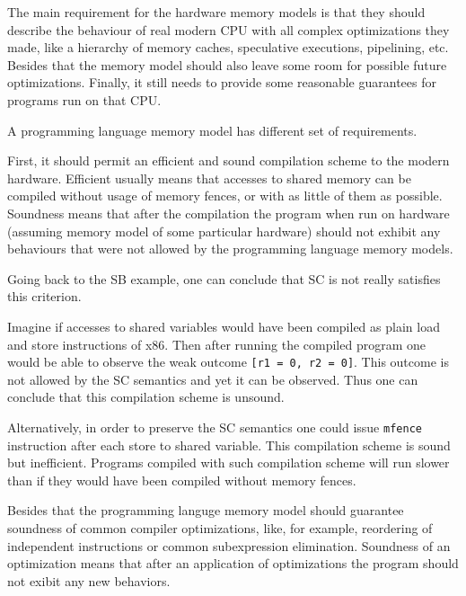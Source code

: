 \documentclass[a4paper,twoside,11pt]{article}
\numberwithin{equation}{section}
\begin{document}
The main requirement for the hardware memory models is that 
they should describe the behaviour of real modern CPU 
with all complex optimizations they made, like a hierarchy of memory caches, speculative executions, pipelining, etc.
Besides that the memory model should also leave some room for possible future optimizations.
Finally, it still needs to provide some reasonable guarantees for programs run on that CPU.       


A programming language memory model has different set of requirements.

First, it should permit an efficient and sound compilation scheme to the modern hardware.
Efficient usually means that accesses to shared memory can be compiled 
without usage of memory fences, or with as little of them as possible. 
Soundness means that after the compilation the program when run on hardware 
(assuming memory model of some particular hardware) should not exhibit
any behaviours that were not allowed by the programming language memory models. 

Going back to the SB example, one can conclude that SC is not really satisfies this criterion. 

Imagine if accesses to shared variables would have been compiled as plain load and store instructions of x86.
Then after running the compiled program one would be able to observe the weak outcome \texttt{[r1 = 0, r2 = 0]}.
This outcome is not allowed by the SC semantics and yet it can be observed.
Thus one can conclude that this compilation scheme is unsound. 

Alternatively, in order to preserve the SC semantics one could 
issue \texttt{mfence} instruction after each store to shared variable.
This compilation scheme is sound but inefficient.
Programs compiled with such compilation scheme will run slower than 
if they would have been compiled without memory fences.

Besides that the programming languge memory model should guarantee soundness of common compiler optimizations,
like, for example, reordering of independent instructions or common subexpression elimination.
Soundness of an optimization means that after an application 
of optimizations the program should not exibit any new behaviors.
\end{document}
